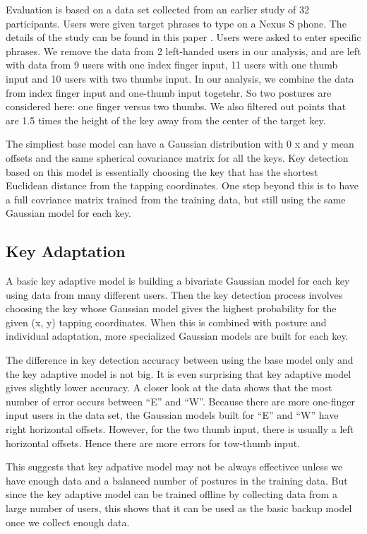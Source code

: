 \documentclass{sigchi}
\begin{document}
Evaluation is based on a data set collected from an earlier study of 32
participants. Users were given target phrases to type on a Nexus S phone. The
details of the study can be found in this paper \cite{Azenkot:2012}. Users were asked to
enter specific phrases. 
We remove the data from 2 left-handed users in our analysis, and are left with
data from 9 users with one index finger input, 11 users with one thumb input and
10 users with two thumbs input.  In our analysis, we combine the data from index finger input
and one-thumb input togetehr. So two postures are considered here: one finger versus two thumbs. We also filtered out points that are 1.5 times
the height of the key away from the center of the target key.

The simpliest base model can have a Gaussian distribution with 0 x and y
mean offsets and the same spherical covariance matrix for all the keys. Key
detection based on this model is essentially choosing the key that has the shortest Euclidean distance from the tapping coordinates. 
One step beyond this is to have a full covriance matrix trained from the
training data, but still using the same Gaussian model for each key.

\subsection{Key Adaptation}
A basic key adaptive model is building a bivariate Gaussian model for each key 
using data from many different users. Then the key detection process involves 
choosing the key whose Gaussian model gives the highest probability for the 
given (x, y) tapping coordinates. When this is combined with posture and 
individual adaptation, more specialized Gaussian models are built for each key.

The difference in key detection accuracy between using the base model only and
the key adaptive model is not big. It is even surprising that key adaptive model
gives slightly lower accuracy. A closer look at the data shows that the most number of error occurs between
``E'' and ``W''. Because there are more one-finger input users in the data set, the 
Gaussian models built for ``E'' and ``W'' have right horizontal offsets. However, for the two thumb input, 
there is usually a left horizontal offsets. Hence there are more errors for tow-thumb input.

This suggests that key adpative model may not be always effectivce unless we have enough data and a balanced
number of postures in the training data. But since the key adaptive model can be trained offline by collecting data from a 
large number of users, this shows that it can be used as the basic backup model once we collect enough data. 
\end{document}
